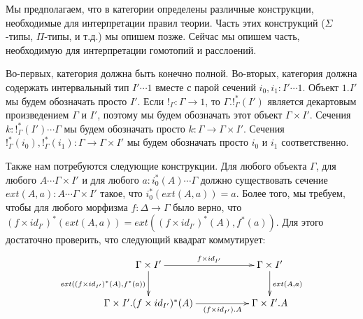 \documentclass{amsart}
\makeatletter
\theoremstyle{definition}
\theoremstyle{remark}
\newcommand{\po}[1][dr]{\save*!/#1+1.2pc/#1:(1,-1)@^{|-}\restore}
\numberwithin{figure}{section}
\makeatother
\begin{document}
Мы предполагаем, что в категории определены различные конструкции, необходимые для интерпретации правил теории.
Часть этих конструкций ($\Sigma$-типы, $\Pi$-типы, и т.д.) мы опишем позже.
Сейчас мы опишем часть, необходимую для интерпретации гомотопий и расслоений.

Во-первых, категория должна быть конечно полной.
Во-вторых, категория должна содержать интервальный тип $I' \dotsb 1$ вместе с парой сечений $i_0, i_1 : I' \dotsb 1$.
Объект $1.I'$ мы будем обозначать просто $I'$.
Если $!_\Gamma : \Gamma \to 1$, то $\Gamma.!_\Gamma^*(I')$ является декартовым произведением $\Gamma$ и $I'$, поэтому мы будем обозначать этот объект $\Gamma \times I'$.
Сечения $k : !_\Gamma^*(I') \dotsb \Gamma$ мы будем обозначать просто $k : \Gamma \to \Gamma \times I'$.
Сечения $!_\Gamma^*(i_0), !_\Gamma^*(i_1) : \Gamma \to \Gamma \times I'$ мы будем обозначать просто $i_0$ и $i_1$ соответственно.

\begin{comment}
Также в категории должен быть выбран насыщенный класс морфизмов, которые мы называем \emph{тривиальными корасслоениями}.
Морфизмы, которые имеют правое свойство поднятия по отношению к тривиальным корасслоениям, мы называем \emph{расслоениями}.
Мы требуем, чтобы для любого $A \dotsb \Gamma$ морфизмы $\pi_A : \Gamma.A \to \Gamma$ являлись расслоениями.

Тривиальные корасслоения должны содержать морфизмы вида $i_0 : \Gamma \to \Gamma \times I'$ и
    $(\Gamma \times I' \amalg \Gamma \times I') \amalg_{\Gamma \amalg \Gamma} \Gamma \times I' \to \Gamma \times I' \times I'$, которые определяются как в следующей диаграмме:
\[ \xymatrix@-1pc{ \Gamma \amalg \Gamma \ar[rr]^{i_0 \amalg i_0} \ar[dd]_{[i_0, i_1]} & & \Gamma \times I' \amalg \Gamma \times I' \ar[dd] \ar[rddd]^{[i_0, i_1]} \\ \\
\Gamma \times I' \ar[rr] \ar[rrrd]_{i_0 \times id_{I'}} & & \po (\Gamma \times I' \amalg \Gamma \times I') \amalg_{\Gamma \amalg \Gamma} \Gamma \times I' \ar@{-->}[rd] \\
                                                                       & & & \Gamma \times I' \times I'
                 } \]
\end{comment}

Также нам потребуются следующие конструкции.
Для любого объекта $\Gamma$, для любого $A \dotsb \Gamma \times I'$ и для любого $a : i_0^*(A) \dotsb \Gamma$ должно существовать сечение $ext(A,a) : A \dotsb \Gamma \times I'$ такое, что $i_0^*(ext(A,a)) = a$.
Более того, мы требуем, чтобы для любого морфизма $f : \Delta \to \Gamma$ было верно, что $(f \times id_{I'})^*(ext(A,a)) = ext((f \times id_{I'})^*(A), f^*(a))$.
Для этого достаточно проверить, что следующий квадрат коммутирует:
\[ \xymatrix{ \Gamma \times I' \ar[rr]^{f \times id_{I'}} \ar[d]_{ext((f \times id_{I'})^*(A), f^*(a))} & & \Gamma \times I' \ar[d]^{ext(A,a)} \\
              \Gamma \times I'.(f \times id_{I'})^*(A) \ar[rr]_-{(f \times id_{I'}).A}                  & & \Gamma \times I'.A
            } \]
\end{document}
